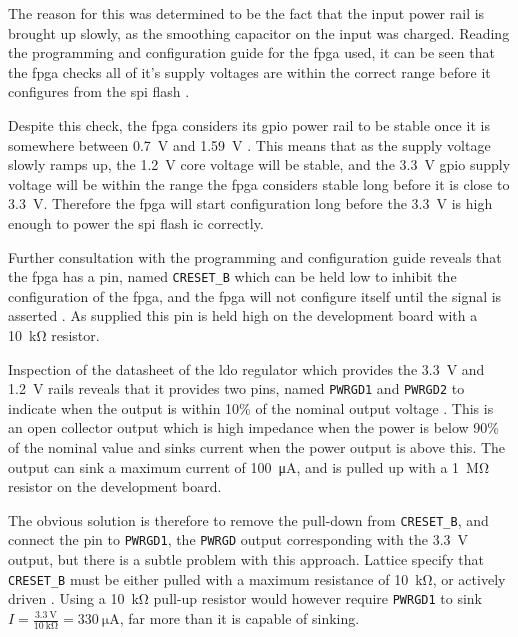 The reason for this was determined to be the fact that the input power rail is brought up slowly, as the smoothing capacitor on the input was charged. Reading the programming and configuration guide for the \gls{fpga} used, it can be seen that the \gls{fpga} checks all of it's supply voltages are within the correct range before it configures from the \gls{spi} flash \cite[p.4]{lattice2016}.

Despite this check, the \gls{fpga} considers its \gls{gpio} power rail to be stable once it is somewhere between \SI{0.7}{\volt} and \SI{1.59}{\volt} \cite[p.3-2]{lattice2017a}. This means that as the supply voltage slowly ramps up, the \SI{1.2}{\volt} core voltage will be stable, and the \SI{3.3}{\volt} \gls{gpio} supply voltage will be within the range the \gls{fpga} considers stable long before it is close to \SI{3.3}{\volt}. Therefore the \gls{fpga} will start configuration long before the \SI{3.3}{\volt} is high enough to power the \gls{spi} flash \gls{ic} correctly.

Further consultation with the programming and configuration guide reveals that the \gls{fpga} has a pin, named \texttt{CRESET\_B} which can be held low to inhibit the configuration of the \gls{fpga}, and the \gls{fpga} will not configure itself until the signal is asserted \cite[p.4]{lattice2016}. As supplied this pin is held high on the development board with a \SI{10}{\kilo\ohm} resistor.

Inspection of the datasheet of the \gls{ldo} regulator which provides the \SI{3.3}{\volt} and \SI{1.2}{\volt} rails reveals that it provides two pins, named \texttt{PWRGD1} and \texttt{PWRGD2} to indicate when the output is within 10\% of the nominal output voltage \cite[p.11]{linear2013}. This is an open collector output which is high impedance when the power is below 90\% of the nominal value and sinks current when the power output is above this. The output can sink a maximum current of \SI{100}{\micro\ampere}, and is pulled up with a \SI{1}{\mega\ohm} resistor on the development board.

The obvious solution is therefore to remove the pull-down from \texttt{CRESET\_B}, and connect the pin to \texttt{PWRGD1}, the \texttt{PWRGD} output corresponding with the \SI{3.3}{\volt} output, but there is a subtle problem with this approach. Lattice specify that \texttt{CRESET\_B} must be either pulled with a maximum resistance of \SI{10}{\kilo\ohm}, or actively driven \cite[p4-1]{lattice2017a}. Using a \SI{10}{\kilo\ohm} pull-up resistor would however require \texttt{PWRGD1} to sink $I=\frac{\SI{3.3}{\volt}}{\SI{10}{\kilo\ohm}}= \SI{330}{\micro\ampere}$, far more than it is capable of sinking.

